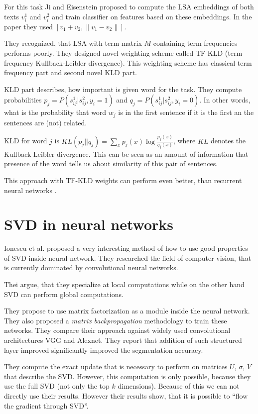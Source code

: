        For this task Ji and Eisenstein proposed to compute the LSA embeddings of both texts $v_i^1$ and $v_i^2$ and train classifier on features based on these embeddings.
        In the paper they used $[v_1 + v_2, \| v_1- v_2 \|]$.
        
        They recognized, that LSA with term matrix $M$ containing term frequencies performs poorly. 
        They designed novel weighting scheme called TF-KLD (term frequency Kullback-Leibler divergence). 
        This weighting scheme has classical term frequency part and second novel KLD part.
        
        KLD part describes, how important is given word for the task.
        They compute probabilities $p_j = P(s_{ij}^1| s_{ij}^2, y_i=1)$ and $q_j = P(s_{ij}^1| s_{ij}^2, y_i=0)$.
        In other words, what is the probability that word $w_j$ is in the first sentence if it is the first an the sentences are (not) related.
        
        KLD for word $j$ is $KL(p_j || q_j) = \sum_x p_j(x) \log \frac{p_j(x)}{q_j(x)}$, where $KL$ denotes the Kullback-Leibler divergence.
        This can be seen as an amount of information that presence of the word tells us about similarity of this pair of sentences. 
    
        This approach with TF-KLD weights can perform even better, than recurrent neural networks \cite{conneau2017supervised}.
    
    
    \cite{wu2017balancing} %
    \cite{deng2014study} %
    \cite{lan2009supervised} %


\section{SVD in neural networks}
    Ionescu et al. \cite{ionescu2015training} %
    proposed a very interesting method of how to use good properties of SVD inside neural network.
    They researched the field of computer vision, that is currently dominated by convolutional neural networks.
    
    Thei argue, that they specialize at local computations while on the other hand SVD can perform global computations.
    
    They propose to use matrix factorization as a module inside the neural network.
    They also proposed a \emph{matrix backpropagation} methodology to train these networks.
    They compare their approach against widely used convolutional architectures VGG and Alexnet. 
    They report that addition of such structured layer improved significantly improved the segmentation accuracy.
    
    They compute the exact update that is necessary to perform on matrices $U$, $\sigma$, $V$ that describe the SVD.
    However, this computation is only possible, because they use the full SVD (not only the top $k$ dimensions).
    Because of this we can not directly use their results.
    However their results show, that it is possible to ``flow the gradient through SVD''.
    
 
    
    
    
    